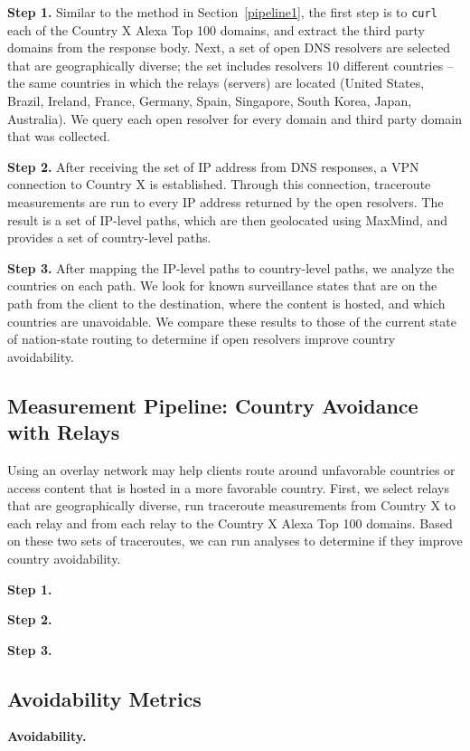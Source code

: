 {\bf Step 1.}  Similar to the method in Section~\ref{pipeline1}, the first step is to {\tt curl} each of the Country X Alexa Top 100 domains, and extract the third party domains from the response body.  Next, a set of open DNS resolvers are selected that are geographically diverse; the set includes resolvers 10 different countries -- the same countries in which the relays (servers) are located (United States, Brazil, Ireland, France, Germany, Spain, Singapore, South Korea, Japan, Australia).  We query each open resolver for every domain and third party domain that was collected.

{\bf Step 2.}  After receiving the set of IP address from DNS responses, a VPN connection to Country X is established.  Through this connection, traceroute measurements are run to every IP address returned by the open resolvers. The result is a set of IP-level paths, which are then geolocated using MaxMind, and provides a set of country-level paths.

{\bf Step 3.}  After mapping the IP-level paths to country-level paths, we analyze the countries on each path.  We look for known surveillance states that are on the path from the client to the destination, where the content is hosted, and which countries are unavoidable.  We compare these results to those of the current state of nation-state routing to determine if open resolvers improve country avoidability.

\subsection{Measurement Pipeline: Country Avoidance with Relays}
Using an overlay network may help clients route around unfavorable countries or access content that is hosted in a more favorable country.  First, we select relays that are geographically diverse, run traceroute measurements from Country X to each relay and from each relay to the Country X Alexa Top 100 domains.  Based on these two sets of traceroutes, we can run analyses to determine if they improve country avoidability.

{\bf Step 1.}  

{\bf Step 2.}

{\bf Step 3.}

\subsection{Avoidability Metrics}
\label{metrics}

{\bf Avoidability.}

